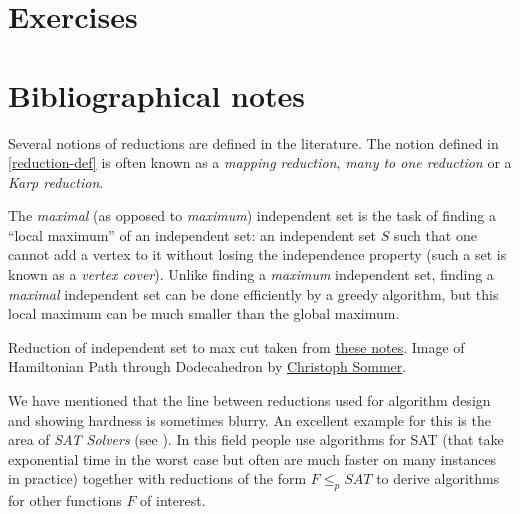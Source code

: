 
\section{Exercises}\label{Exercises}

\section{Bibliographical notes}\label{reductionsbibnotes}

Several notions of reductions are defined in the literature. The notion
defined in \cref{reduction-def} is often known as a \emph{mapping
reduction}, \emph{many to one reduction} or a \emph{Karp reduction}.

The \emph{maximal} (as opposed to \emph{maximum}) independent set is the
task of finding a ``local maximum'' of an independent set: an
independent set \(S\) such that one cannot add a vertex to it without
losing the independence property (such a set is known as a \emph{vertex
cover}). Unlike finding a \emph{maximum} independent set, finding a
\emph{maximal} independent set can be done efficiently by a greedy
algorithm, but this local maximum can be much smaller than the global
maximum.

Reduction of independent set to max cut taken from
\href{https://people.engr.ncsu.edu/mfms/Teaching/CSC505/wrap/Lectures/week14.pdf}{these
notes}. Image of Hamiltonian Path through Dodecahedron by
\href{https://commons.wikimedia.org/wiki/File:Hamiltonian_path.svg}{Christoph
Sommer}.

We have mentioned that the line between reductions used for algorithm
design and showing hardness is sometimes blurry. An excellent example
for this is the area of \emph{SAT Solvers} (see
\cite{gomes2008satisfiability}). In this field people use algorithms for
SAT (that take exponential time in the worst case but often are much
faster on many instances in practice) together with reductions of the
form \(F \leq_p \ensuremath{\mathit{SAT}}\) to derive algorithms for
other functions \(F\) of interest.
